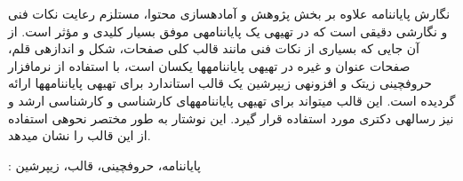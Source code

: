 


\pagestyle{empty}

نگارش پایاننامه علاوه بر بخش پژوهش و آمادهسازی محتوا،
مستلزم رعایت نکات فنی و نگارشی دقیقی است 
که در تهیهی یک پایاننامهی موفق بسیار کلیدی و مؤثر است.
از آن جایی که بسیاری از نکات فنی مانند قالب کلی صفحات، شکل و اندازهی قلم، 
صفحات عنوان و غیره در تهیهی پایاننامهها یکسان است،
با استفاده از نرمافزار حروفچینی زیتک %
و افزونهی زیپرشین %
یک قالب استاندارد برای تهیهی پایاننامهها ارائه گردیده است.
این قالب میتواند برای تهیهی پایاننامههای
کارشناسی و کارشناسی ارشد و نیز رسالهی دکتری مورد استفاده قرار گیرد.
این نوشتار به طور مختصر نحوهی استفاده از این قالب را نشان میدهد.

 : 
پایاننامه، حروفچینی، قالب، زیپرشین

